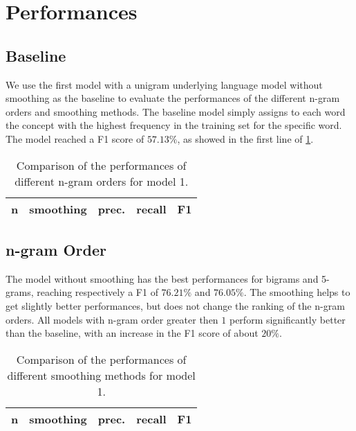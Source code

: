 \section{Performances}
\label{sec:performances}

\subsection{Baseline}
We use the first model with a unigram underlying language model without smoothing as the baseline to evaluate the performances of the different n-gram orders and smoothing methods.
The baseline model simply assigns to each word the concept with the highest frequency in the training set for the specific word.
The model reached a F1 score of $57.13\%$, as showed in the first line of \cref{tab:v1-ngrams}. 

\begin{table}[t!]
	\centering
    \begin{tabular}{ l l l l l }
    	\toprule
    		n & smoothing & prec. & recall & F1 \\
    	\midrule
            
    	\bottomrule
	\end{tabular}
    \caption{Comparison of the performances of different n-gram orders for model 1.}
	\label{tab:v1-ngrams}
\end{table}

\subsection{n-gram Order}
The model without smoothing has the best performances for bigrams and 5-grams, reaching respectively a F1 of $76.21\%$  and $76.05\%$.
The smoothing helps to get slightly better performances, but does not change the ranking of the n-gram orders.
All models with n-gram order greater then $1$ perform significantly better than the baseline, with an increase in the F1 score of about $20\%$.

\begin{table}[t!]
	\centering
    \begin{tabular}{ l l l l l }
    	\toprule
    		n & smoothing & prec. & recall & F1 \\
    	\midrule
            
    	\bottomrule
	\end{tabular}
    \caption{Comparison of the performances of different smoothing methods for model 1.}
	\label{tab:v1-smoothing}
\end{table}

